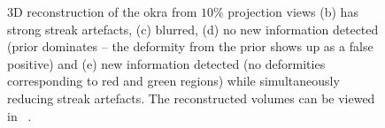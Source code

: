 \documentclass[journal]{IEEEtran}
\begin{document}
\begin{figure}[!h]
\hfill
{}
\caption{3D reconstruction of the okra from $10\%$ projection
  views (b) has strong streak artefacts, (c) blurred, (d) no new
  information detected (prior dominates -- the deformity from the prior
  shows up as a false positive) and (e) new information detected (no deformities
  corresponding to red and green regions) while simultaneously
  reducing streak artefacts. The reconstructed volumes can be viewed in ~\cite{supp_paper}.}
\label{fig:okra_3D_results}
\end{figure}

\end{document}
